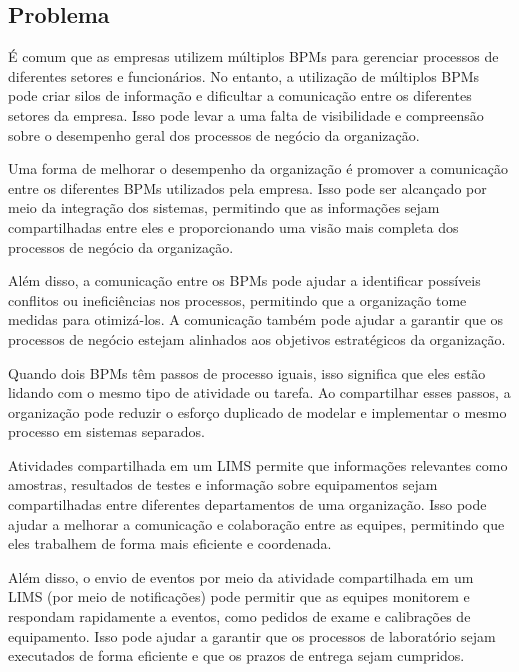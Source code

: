 \subsection{Problema}

É comum que as empresas utilizem múltiplos BPMs para gerenciar processos de diferentes setores e funcionários.
No entanto, a utilização de múltiplos BPMs pode criar silos de informação e dificultar a comunicação entre os diferentes setores da empresa. Isso pode levar a uma falta de visibilidade e compreensão sobre o desempenho geral dos processos de negócio da organização.

Uma forma de melhorar o desempenho da organização é promover a comunicação entre os diferentes BPMs utilizados pela empresa. Isso pode ser alcançado por meio da integração dos sistemas, permitindo que as informações sejam compartilhadas entre eles e proporcionando uma visão mais completa dos processos de negócio da organização.

Além disso, a comunicação entre os BPMs pode ajudar a identificar possíveis conflitos ou ineficiências nos processos, permitindo que a organização tome medidas para otimizá-los. A comunicação também pode ajudar a garantir que os processos de negócio estejam alinhados aos objetivos estratégicos da organização.

Quando dois BPMs têm passos de processo iguais, isso significa que eles estão lidando com o mesmo tipo de atividade ou tarefa. Ao compartilhar esses passos, a organização pode reduzir o esforço duplicado de modelar e implementar o mesmo processo em sistemas separados.

Atividades compartilhada em um LIMS permite que informações relevantes como amostras, resultados de testes e informação sobre equipamentos sejam compartilhadas entre diferentes departamentos de uma organização. Isso pode ajudar a melhorar a comunicação e colaboração entre as equipes, permitindo que eles trabalhem de forma mais eficiente e coordenada.

Além disso, o envio de eventos por meio da atividade compartilhada em um LIMS (por meio de notificações) pode permitir que as equipes monitorem e respondam rapidamente a eventos, como pedidos de exame e calibrações de equipamento. Isso pode ajudar a garantir que os processos de laboratório sejam executados de forma eficiente e que os prazos de entrega sejam cumpridos.